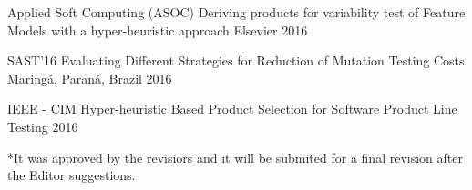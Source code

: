

\begin{cventries}

\cventry
	{Applied Soft Computing (ASOC)} %
	{Deriving products for variability test of Feature Models with a hyper-heuristic approach} %
	{Elsevier} %
	{2016} %
	{
	}

  \cventry
    {SAST'16} %
    {Evaluating Different Strategies for Reduction of Mutation Testing Costs} %
    {Maringá, Paraná, Brazil} %
    {2016} %
    {
    }

  \cventry
    {IEEE - CIM} %
    {Hyper-heuristic Based Product Selection for Software Product Line Testing} %
    {} %
    {2016} %
    {
      \begin{cvitems} %
        \item {*It was approved by the revisiors and it will be submited for a final revision after the Editor suggestions.}
      \end{cvitems}
    }

\end{cventries}
